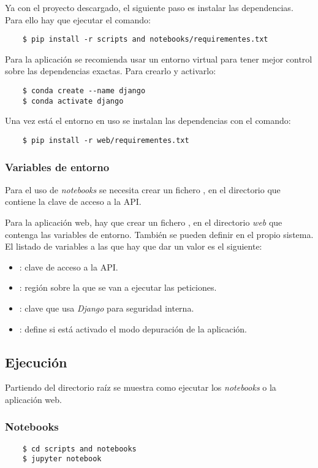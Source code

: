 Ya con el proyecto descargado, el siguiente paso es instalar las dependencias. Para ello hay que ejecutar el comando:
\begin{lstlisting}
	$ pip install -r scripts and notebooks/requirementes.txt
\end{lstlisting}
Para la aplicación se recomienda usar un entorno virtual para tener mejor control sobre las dependencias exactas. Para crearlo y activarlo:
\begin{lstlisting}
	$ conda create --name django
	$ conda activate django
\end{lstlisting}
Una vez está el entorno en uso se instalan las dependencias con el comando:
\begin{lstlisting}
	$ pip install -r web/requirementes.txt
\end{lstlisting}

\subsubsection{Variables de entorno}
Para el uso de \textit{notebooks} se necesita crear un fichero , en el directorio  que contiene la clave de acceso a la API.

Para la aplicación web, hay que crear un fichero , en el directorio \textit{web} que contenga las variables de entorno. También se pueden definir en el propio sistema. El listado de variables a las que hay que dar un valor es el siguiente:
\begin{itemize}
	\item {}: clave de acceso a la API.
	\item {}: región sobre la que se van a ejecutar las peticiones.
	\item {}: clave que usa \textit{Django} para seguridad interna.
	\item {}: define si está activado el modo depuración de la aplicación.
\end{itemize}

\subsection{Ejecución}
Partiendo del directorio raíz se muestra como ejecutar los \textit{notebooks} o la aplicación web.
\subsubsection{Notebooks}
\begin{lstlisting}
	$ cd scripts and notebooks
	$ jupyter notebook
\end{lstlisting}
